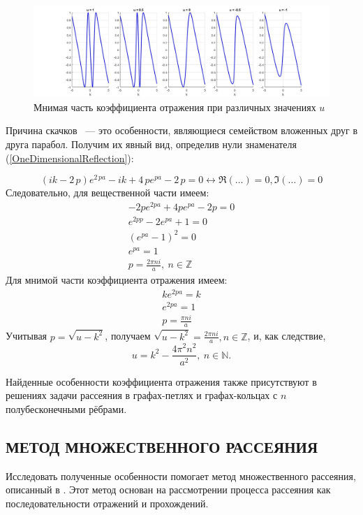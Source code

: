 \documentclass[a4 paper, 12 pt]{extarticle}
\begin{document}
   \begin{figure}[!htb]
   	\centering
   	\includegraphics[scale=0.35]{imag.jpg}
   	\caption{Мнимая часть коэффициента отражения при различных значениях $u$}
   \end{figure}

   Причина скачков ~--- это особенности, являющиеся семейством вложенных друг в друга парабол. Получим их явный вид, определив нули знаменателя (\ref{OneDimensionalReflection}):
   
   \[\left( ik-2\,p \right) {e}^{2\,pa}-ik+4\,p{e}^{pa}-2\,p = 0 \longleftrightarrow \Re\left(\ldots\right) = 0, \Im\left(\ldots\right) = 0\]
   Следовательно, для вещественной части имеем:
   \begin{eqnarray*}
   -2pe^{2pa}+4pe^{pa}-2p = 0 \\
    e^{2pp} - 2e^{pa}+1 = 0 \\
   \left(e^{pa}-1\right)^2 = 0 \\
   e^{pa} = 1 \\
   p = \frac{2\pi n i}{a}, \ n \in \mathbb{Z}
   \end{eqnarray*}
   Для мнимой части коэффициента отражения имеем:
   \begin{eqnarray*}
   ke^{2pa} =k \\
   e^{2pa} = 1 \\
   p = \frac{\pi n i}{a}
   \end{eqnarray*}
   Учитывая $p = \sqrt{u-k^2}$, получаем $\sqrt{u-k^2} = \frac{2\pi n i}{a}, n \in \mathbb{Z}$, и, как следствие,
   \[u = k^2 - \frac{4 \pi^2 n^2}{a^2}, \ n \in \mathbb{N}.
   \]
   
   Найденные особенности коэффициента отражения также присутствуют в решениях задачи рассеяния в графах-петлях и графах-кольцах с $n$ полубесконечными рёбрами.
   
   \subsection{МЕТОД МНОЖЕСТВЕННОГО РАССЕЯНИЯ}
   Исследовать полученные особенности помогает метод множественного рассеяния, описанный в \cite{Beam}. Этот метод основан на рассмотрении процесса рассеяния как последовательности отражений и прохождений.
\end{document}
